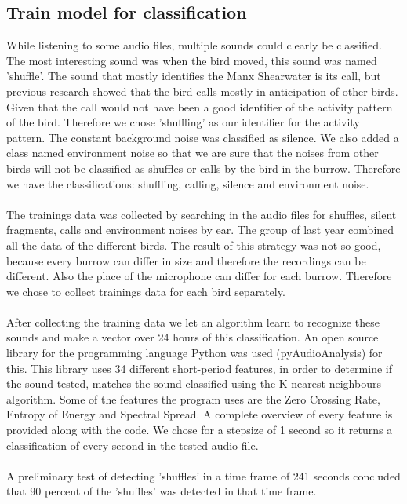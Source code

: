 \documentclass[a4paper]{article}
\begin{document}
\subsection*{Train model for classification }
While listening to some audio files, multiple sounds could clearly be classified. The most interesting sound was when the bird moved, this sound was named 'shuffle'. The sound that mostly identifies the Manx Shearwater is its call, but previous research showed that the bird calls mostly in anticipation of other birds\cite{brooke1978sexual}. Given that the call would not have been a good identifier of the activity pattern of the bird. Therefore we chose 'shuffling' as our identifier for the activity pattern. The constant background noise was classified as silence. We also added a class named environment noise so that we are sure that the noises from other birds will not be classified as shuffles or calls by the bird in the burrow.
Therefore we have the classifications: shuffling, calling, silence and environment noise.\\\\The trainings data was collected by searching in the audio files for shuffles, silent fragments, calls and environment noises by ear. The group of last year combined all the data of the different birds. The result of this strategy was not so good, because every burrow can differ in size and therefore the recordings can be different. Also the place of the microphone can differ for each burrow. Therefore we chose to collect trainings data for each bird separately.\\\\After collecting the training data we let an algorithm learn to recognize these sounds and make a vector over 24 hours of this classification. An open source library for the programming language Python was used (pyAudioAnalysis)\cite{giannakopoulos2015pyaudioanalysis} for this. This library  uses 34 different short-period features, in order to determine if the sound tested, matches the sound classified using the K-nearest neighbours algorithm. Some of the features the program uses are the Zero Crossing Rate, Entropy of Energy and Spectral Spread. A complete overview of every feature is provided along with the code. We chose for a stepsize of 1 second so it returns a classification of every second in the tested audio file.
\\\\A preliminary test of detecting 'shuffles' in a time frame of 241 seconds concluded that 90 percent of the 'shuffles' was detected in that time frame. \\
\end{document}
